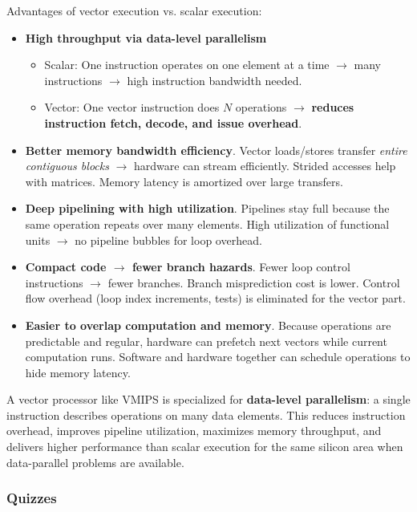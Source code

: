 \noindent
Advantages of vector execution vs. scalar execution:
\begin{itemize}[label=\textcolor{Green3}{}]
    \item \textcolor{Green3}{\textbf{High throughput via data-level parallelism}}
    \begin{itemize}
        \item Scalar: One instruction operates on one element at a time $\rightarrow$ many instructions $\rightarrow$ high instruction bandwidth needed.
        \item Vector: One vector instruction does $N$ operations $\rightarrow$ \textbf{reduces instruction fetch, decode, and issue overhead}.
    \end{itemize}
    
    \item \textcolor{Green3}{\textbf{Better memory bandwidth efficiency}}. Vector loads/stores transfer \emph{entire contiguous blocks} $\rightarrow$ hardware can stream efficiently. Strided accesses help with matrices. Memory latency is amortized over large transfers.
    \item \textcolor{Green3}{\textbf{Deep pipelining with high utilization}}. Pipelines stay full because the same operation repeats over many elements. High utilization of functional units $\rightarrow$ no pipeline bubbles for loop overhead.
    \item \textcolor{Green3}{\textbf{Compact code $\rightarrow$ fewer branch hazards}}. Fewer loop control instructions $\rightarrow$ fewer branches. Branch misprediction cost is lower. Control flow overhead (loop index increments, tests) is eliminated for the vector part.
    \item \textcolor{Green3}{\textbf{Easier to overlap computation and memory}}. Because operations are predictable and regular, hardware can prefetch next vectors while current computation runs. Software and hardware together can schedule operations to hide memory latency.
\end{itemize}
A vector processor like VMIPS is specialized for \textbf{data-level parallelism}: a single instruction describes operations on many data elements. This reduces instruction overhead, improves pipeline utilization, maximizes memory throughput, and delivers higher performance than scalar execution for the same silicon area when data-parallel problems are available.

\newpage

\subsubsection*{Quizzes}


